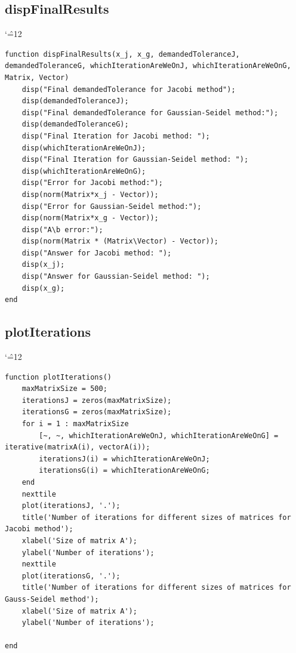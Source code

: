 \documentclass[12pt]{report}
\newenvironment{simplechar}{%
   \catcode`\^=12
}{}
\begin{document}
\subsection{dispFinalResults}
\begin{simplechar}
\begin{lstlisting}
function dispFinalResults(x_j, x_g, demandedToleranceJ, demandedToleranceG, whichIterationAreWeOnJ, whichIterationAreWeOnG, Matrix, Vector)
    disp("Final demandedTolerance for Jacobi method");
    disp(demandedToleranceJ);
    disp("Final demandedTolerance for Gaussian-Seidel method:");
    disp(demandedToleranceG);
    disp("Final Iteration for Jacobi method: ");
    disp(whichIterationAreWeOnJ);
    disp("Final Iteration for Gaussian-Seidel method: ");
    disp(whichIterationAreWeOnG);
    disp("Error for Jacobi method:");
    disp(norm(Matrix*x_j - Vector));
    disp("Error for Gaussian-Seidel method:");
    disp(norm(Matrix*x_g - Vector));
    disp("A\b error:");
    disp(norm(Matrix * (Matrix\Vector) - Vector));
    disp("Answer for Jacobi method: ");
    disp(x_j);
    disp("Answer for Gaussian-Seidel method: ");
    disp(x_g);
end
\end{lstlisting}
\end{simplechar}

\newpage
\subsection{plotIterations}
\begin{simplechar}
\begin{lstlisting}
function plotIterations()
    maxMatrixSize = 500;
    iterationsJ = zeros(maxMatrixSize);
    iterationsG = zeros(maxMatrixSize);
    for i = 1 : maxMatrixSize
        [~, ~, whichIterationAreWeOnJ, whichIterationAreWeOnG] = iterative(matrixA(i), vectorA(i));
        iterationsJ(i) = whichIterationAreWeOnJ;
        iterationsG(i) = whichIterationAreWeOnG;
    end
    nexttile
    plot(iterationsJ, '.');
    title('Number of iterations for different sizes of matrices for Jacobi method');
    xlabel('Size of matrix A');
    ylabel('Number of iterations');
    nexttile
    plot(iterationsG, '.');
    title('Number of iterations for different sizes of matrices for Gauss-Seidel method');
    xlabel('Size of matrix A');
    ylabel('Number of iterations');

end
\end{lstlisting}
\end{simplechar}


\newpage
\end{document}
